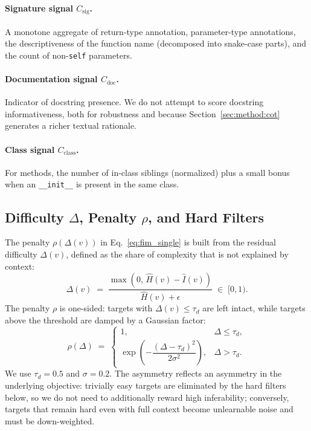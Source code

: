 \paragraph{Signature signal $C_{\mathrm{sig}}$.}
A monotone aggregate of return-type annotation, parameter-type annotations,
the descriptiveness of the function name (decomposed into snake-case
parts), and the count of non-\texttt{self} parameters.

\paragraph{Documentation signal $C_{\mathrm{doc}}$.}
Indicator of docstring presence. We do not attempt to score docstring
informativeness, both for robustness and because
Section~\ref{sec:method:cot} generates a richer textual rationale.

\paragraph{Class signal $C_{\mathrm{class}}$.}
For methods, the number of in-class siblings (normalized) plus a small
bonus when an \texttt{\_\_init\_\_} is present in the same class.

\subsection{Difficulty $\Delta$, Penalty $\rho$, and Hard Filters}
\label{app:algo:penalty}

The penalty $\rho(\Delta(v))$ in Eq.~\eqref{eq:fim_single} is built from
the residual difficulty $\Delta(v)$, defined as the share of complexity
that is not explained by context:
%
\begin{equation}
  \Delta(v) \;=\; \frac{\max\!\left(0,\,\hat{H}(v) - \hat{I}(v)\right)}{\hat{H}(v) + \epsilon}
  \;\in\; [0, 1).
  \label{eq:delta}
\end{equation}
%
The penalty $\rho$ is one-sided: targets with $\Delta(v) \le \tau_d$ are
left intact, while targets above the threshold are damped by a Gaussian
factor:
%
\begin{equation}
  \rho(\Delta) \;=\;
  \begin{cases}
    1, & \Delta \le \tau_d, \\[2pt]
    \exp\!\left(-\dfrac{(\Delta - \tau_d)^2}{2\sigma^2}\right), & \Delta > \tau_d.
  \end{cases}
  \label{eq:penalty}
\end{equation}
%
We use $\tau_d = 0.5$ and $\sigma = 0.2$. The asymmetry reflects an
asymmetry in the underlying objective: trivially easy targets are
eliminated by the hard filters below, so we do not need to additionally
reward high inferability; conversely, targets that remain hard even with
full context become unlearnable noise and must be down-weighted.

